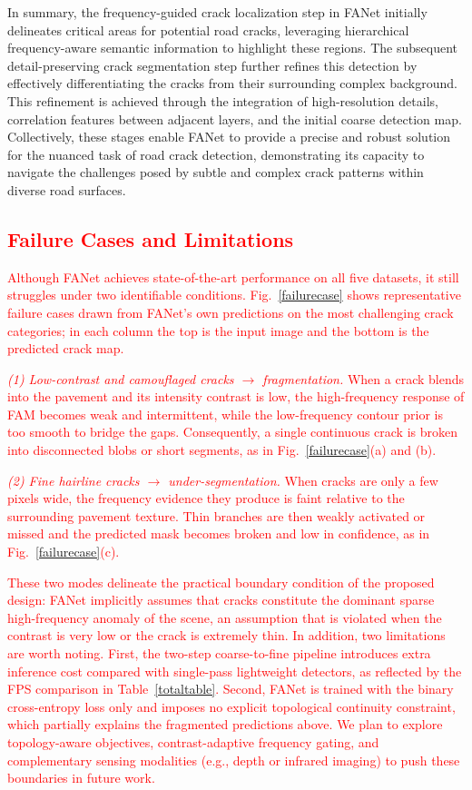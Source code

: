 \documentclass[journal]{IEEEtran}
\begin{document}
In summary, the frequency-guided crack localization step in FANet initially delineates critical areas for potential road cracks, leveraging hierarchical frequency-aware semantic information to highlight these regions. The subsequent detail-preserving crack segmentation step further refines this detection by effectively differentiating the cracks from their surrounding complex background. This refinement is achieved through the integration of high-resolution details, correlation features between adjacent layers, and the initial coarse detection map. Collectively, these stages enable FANet to provide a precise and robust solution for the nuanced task of road crack detection, demonstrating its capacity to navigate the challenges posed by subtle and complex crack patterns within diverse road surfaces.


\subsection{\textcolor{red}{Failure Cases and Limitations}}
\textcolor{red}{Although FANet achieves state-of-the-art performance on all five datasets, it still struggles under two identifiable conditions. Fig.~\ref{failurecase} shows representative failure cases drawn from FANet's own predictions on the most challenging crack categories; in each column the top is the input image and the bottom is the predicted crack map.}

\textcolor{red}{\emph{(1) Low-contrast and camouflaged cracks $\rightarrow$ fragmentation.} When a crack blends into the pavement and its intensity contrast is low, the high-frequency response of FAM becomes weak and intermittent, while the low-frequency contour prior is too smooth to bridge the gaps. Consequently, a single continuous crack is broken into disconnected blobs or short segments, as in Fig.~\ref{failurecase}(a) and (b).}

\textcolor{red}{\emph{(2) Fine hairline cracks $\rightarrow$ under-segmentation.} When cracks are only a few pixels wide, the frequency evidence they produce is faint relative to the surrounding pavement texture. Thin branches are then weakly activated or missed and the predicted mask becomes broken and low in confidence, as in Fig.~\ref{failurecase}(c).}

\textcolor{red}{These two modes delineate the practical boundary condition of the proposed design: FANet implicitly assumes that cracks constitute the dominant sparse high-frequency anomaly of the scene, an assumption that is violated when the contrast is very low or the crack is extremely thin. In addition, two limitations are worth noting. First, the two-step coarse-to-fine pipeline introduces extra inference cost compared with single-pass lightweight detectors, as reflected by the FPS comparison in Table~\ref{totaltable}. Second, FANet is trained with the binary cross-entropy loss only and imposes no explicit topological continuity constraint, which partially explains the fragmented predictions above. We plan to explore topology-aware objectives, contrast-adaptive frequency gating, and complementary sensing modalities (e.g., depth or infrared imaging) to push these boundaries in future work.}
\end{document}

